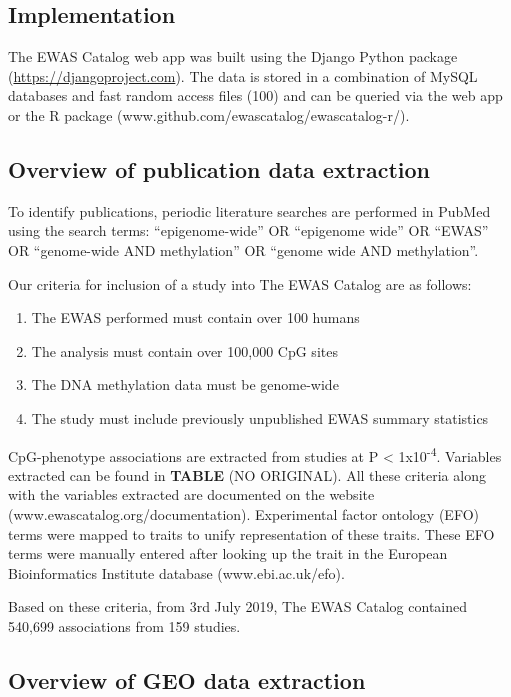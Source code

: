 \documentclass[11pt,twoside]{bristolthesis}
\providecommand{\tightlist}{%
  \setlength{\itemsep}{0pt}\setlength{\parskip}{0pt}}
\begin{document}
\hypertarget{implementation}{%
\subsection{Implementation}\label{implementation}}

The EWAS Catalog web app was built using the Django Python package (\url{https://djangoproject.com}). The data is stored in a combination of MySQL databases and fast random access files (100) and can be queried via the web app or the R package (www.github.com/ewascatalog/ewascatalog-r/).

\hypertarget{overview-of-publication-data-extraction}{%
\subsection{Overview of publication data extraction}\label{overview-of-publication-data-extraction}}

To identify publications, periodic literature searches are performed in PubMed using the search terms: ``epigenome-wide'' OR ``epigenome wide'' OR ``EWAS'' OR ``genome-wide AND methylation'' OR ``genome wide AND methylation''.

Our criteria for inclusion of a study into The EWAS Catalog are as follows:
\begin{enumerate}
\def\labelenumi{\arabic{enumi}.}
\tightlist
\item
  The EWAS performed must contain over 100 humans
\item
  The analysis must contain over 100,000 CpG sites
\item
  The DNA methylation data must be genome-wide
\item
  The study must include previously unpublished EWAS summary statistics
\end{enumerate}
CpG-phenotype associations are extracted from studies at P \textless{} 1x10\textsuperscript{-4}. Variables extracted can be found in \textbf{TABLE} (NO ORIGINAL). All these criteria along with the variables extracted are documented on the website (www.ewascatalog.org/documentation). Experimental factor ontology (EFO) terms were mapped to traits to unify representation of these traits. These EFO terms were manually entered after looking up the trait in the European Bioinformatics Institute database (www.ebi.ac.uk/efo).

Based on these criteria, from 3rd July 2019, The EWAS Catalog contained 540,699 associations from 159 studies.

\hypertarget{overview-of-geo-data-extraction}{%
\subsection{Overview of GEO data extraction}\label{overview-of-geo-data-extraction}}
\end{document}
